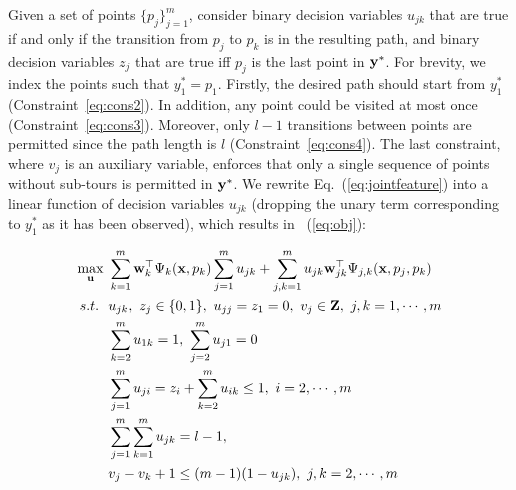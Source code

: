 Given a set of points $\{p_j\}_{j=1}^m$, 
consider binary decision variables $u_{jk}$ that are true if and only if
the transition from $p_j$ to $p_k$ is in the resulting path,
and binary decision variables $z_j$ that are true iff $p_j$ is the last point in $\mathbf{y}^*$.
For brevity, we index the points such that $y_1^* = p_1$.
Firstly, the desired path should start from $y_1^*$ (Constraint~\ref{eq:cons2}).
In addition, any point could be visited at most once (Constraint~\ref{eq:cons3}).
Moreover, only $l-1$ transitions between points are permitted
since the path length is $l$ (Constraint~\ref{eq:cons4}).
The last constraint, where $v_j$ is an auxiliary variable,
enforces that only a single sequence of points without sub-tours is permitted in $\mathbf{y}^*$.
We rewrite Eq.~(\ref{eq:jointfeature}) into a linear function of decision variables $u_{jk}$
(dropping the unary term corresponding to $y_1^*$ as it has been observed), which results in ~(\ref{eq:obj}):

\begin{alignat}{5}
\max_{\mathbf{u}} ~& \sum_{k=1}^m \mathbf{w}_k^\top \Psi_k(\mathbf{x}, p_k) \sum_{j=1}^m u_{jk}
+ \sum_{j,k=1}^m u_{jk} \mathbf{w}_{jk}^\top \Psi_{j, k}(\mathbf{x}, p_j, p_k)                                  \label{eq:obj} \\
s.t. ~~& u_{jk}, ~z_j \in \{0, 1\}, ~u_{jj} = z_1 = 0, ~v_j \in \mathbf{Z}, ~j,k = 1,\cdots,m   \label{eq:cons1} \\
  & \sum_{k=2}^m u_{1k} = 1, ~\sum_{j=2}^m u_{j1} = 0                                           \label{eq:cons2} \\
  & \sum_{j=1}^m u_{ji} = z_i + \sum_{k=2}^m u_{ik} \le 1, ~i = 2,\cdots,m                      \label{eq:cons3} \\
  & \sum_{j=1}^m \sum_{k=1}^m u_{jk} = l-1,                                                     \label{eq:cons4} \\
  & v_j - v_k + 1 \le (m-1) (1-u_{jk}), ~j,k = 2,\cdots,m                                       \label{eq:cons5}
\end{alignat}


